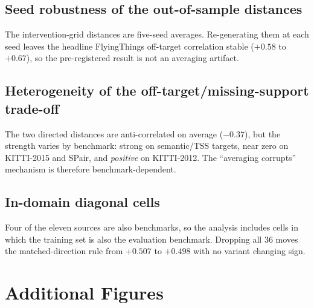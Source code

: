 \documentclass[runningheads]{llncs}
\newcommand{\dtb}{d_{S\to T}}
\newcommand{\dbt}{d_{T\to S}}
\begin{document}
\subsection{Seed robustness of the out-of-sample distances}
The intervention-grid distances are five-seed averages. Re-generating them at
each seed leaves the headline FlyingThings off-target correlation stable
($+0.58$ to $+0.67$), so the pre-registered result is not an averaging
artifact.
\begin{table}[h]\centering\small

\caption{From-scratch off-target correlation by distance-estimation seed.}
\label{tab:new_seedaudit}
\end{table}

\subsection{Heterogeneity of the off-target/missing-support trade-off}
The two directed distances are anti-correlated on average ($-0.37$), but the
strength varies by benchmark: strong on semantic/TSS targets, near
zero on KITTI-2015 and SPair, and \emph{positive} on KITTI-2012. The
``averaging corrupts'' mechanism is therefore benchmark-dependent.
\begin{table}[h]\centering\small

\caption{Within-context Spearman between $\dtb$ and $\dbt$ across sources,
per benchmark.}
\label{tab:new_anticorr}
\end{table}

\subsection{In-domain diagonal cells}
Four of the eleven sources are also benchmarks, so the analysis includes
cells in which the training set is also the evaluation benchmark. Dropping all
36 moves the matched-direction rule from
$+0.507$ to $+0.498$ with no variant changing sign.
\begin{table}[h]\centering\small
\resizebox{\linewidth}{!}{}
\caption{Matched-direction rule with and without in-domain diagonal cells.}
\label{tab:new_diagonal}
\end{table}

\section{Additional Figures}
\label{supp:figs}
\end{document}
